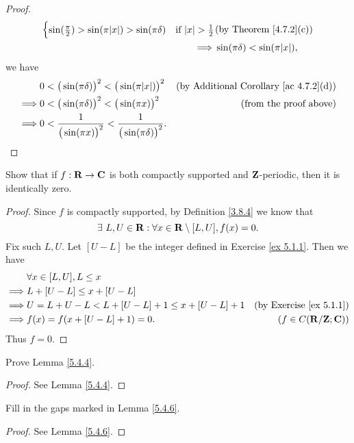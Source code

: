 \begin{proof}
\begin{align*}
\begin{cases}
                       \sin(\frac{\pi}{2}) > \sin(\pi \abs{x}) > \sin(\pi \delta)    & \text{if } \abs{x} > \frac{1}{2}    \\
                   \end{cases}    & \text{(by Theorem \ref{4.7.2}(c))}    \\
        \implies & \sin(\pi \delta) < \sin(\pi \abs{x}),
    \end{align*}
    we have
    \begin{align*}
                 & 0 < \big(\sin(\pi \delta)\big)^2 < \big(\sin(\pi \abs{x})\big)^2                & \text{(by Additional Corollary \ref{ac 4.7.2}(d))} \\
        \implies & 0 < \big(\sin(\pi \delta)\big)^2 < \big(\sin(\pi x)\big)^2                      & \text{(from the proof above)}                      \\
        \implies & 0 < \frac{1}{\big(\sin(\pi x)\big)^2} < \frac{1}{\big(\sin(\pi \delta)\big)^2}.
    \end{align*}
\end{proof}

\exercisesection

\begin{exercise}\label{ex 5.4.1}
    Show that if \(f : \mathbf{R} \to \mathbf{C}\) is both compactly supported and \(\mathbf{Z}\)-periodic, then it is identically zero.
\end{exercise}

\begin{proof}
    Since \(f\) is compactly supported, by Definition \ref{3.8.4} we know that
    \[
        \exists\ L, U \in \mathbf{R} : \forall x \in \mathbf{R} \setminus [L, U], f(x) = 0.
    \]
    Fix such \(L, U\).
    Let \([U - L]\) be the integer defined in Exercise \ref{ex 5.1.1}.
    Then we have
    \begin{align*}
                 & \forall x \in [L, U], L \leq x                                                             \\
        \implies & L + [U - L] \leq x + [U - L]                                                               \\
        \implies & U = L + U - L < L + [U - L] + 1 \leq x + [U - L] + 1 & \text{(by Exercise \ref{ex 5.1.1})} \\
        \implies & f(x) = f(x + [U - L] + 1) = 0.                       & (f \in C(\mathbf{R} / \mathbf{Z} ; \mathbf{C}))
    \end{align*}
    Thus \(f = 0\).
\end{proof}

\begin{exercise}\label{ex 5.4.2}
    Prove Lemma \ref{5.4.4}.
\end{exercise}

\begin{proof}
    See Lemma \ref{5.4.4}.
\end{proof}

\begin{exercise}\label{ex 5.4.3}
    Fill in the gaps marked in Lemma \ref{5.4.6}.
\end{exercise}

\begin{proof}
    See Lemma \ref{5.4.6}.
\end{proof}